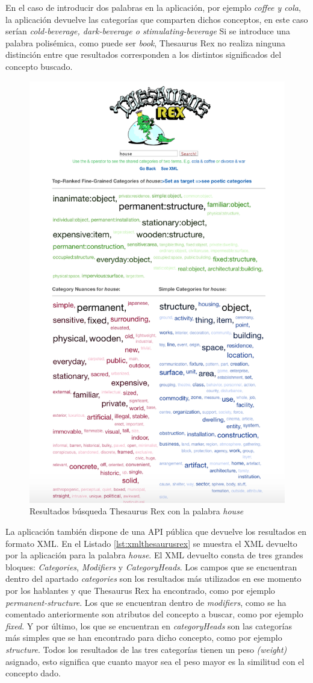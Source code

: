 En el caso de introducir dos palabras en la aplicación, por ejemplo \textit{coffee y cola}, la aplicación devuelve las categorías que comparten dichos conceptos, en este caso serían \textit{cold-beverage, dark-beverage o stimulating-beverage} Si se introduce una palabra polisémica, como puede ser \textit{book}, Thesaurus Rex no realiza ninguna distinción entre que resultados corresponden a los distintos significados del concepto buscado.
\begin{figure}[!h]
	\includegraphics[width=.6\textwidth]{Imagenes/Bitmap/Capitulo2/thesaurusrex.png}
	\centering
	\caption{Resultados búsqueda Thesaurus Rex con la palabra \textit{house}}
	\label{fig:thesaurusrex}
\end{figure}

La aplicación también dispone de una API pública que devuelve los resultados en formato XML.
En el Listado \ref{lst:xmlthesaurusrex} se muestra el XML devuelto por la aplicación para la palabra \textit{house}. El XML devuelto consta de tres grandes bloques: \textit{Categories}, \textit{Modifiers} y \textit{CategoryHeads}. 
Los campos que se encuentran dentro del apartado \textit{categories} son los resultados más utilizados en ese momento por los hablantes y que Thesaurus Rex ha encontrado, como por ejemplo \textit{permanent-structure}. Los que se encuentran dentro de  \textit{modifiers}, como se ha comentado anteriormente son atributos del concepto a buscar, como por ejemplo \textit{fixed}. Y por último, los que se encuentran en \textit{categoryHeads} son las categorías más simples que se han encontrado para dicho concepto, como por ejemplo \textit{structure}. Todos los resultados de las tres categorías tienen un peso \textit{(weight)} asignado, esto significa que cuanto mayor sea el peso mayor es la similitud con el concepto dado. 

